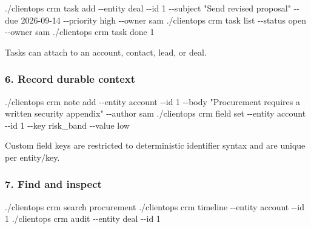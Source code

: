\documentclass[
]{article}
\newenvironment{Shaded}{}{}
\newcommand{\AttributeTok}[1]{\textcolor[rgb]{0.49,0.56,0.16}{#1}}
\newcommand{\ExtensionTok}[1]{#1}
\newcommand{\NormalTok}[1]{#1}
\newcommand{\StringTok}[1]{\textcolor[rgb]{0.25,0.44,0.63}{#1}}
\begin{document}
\begin{Shaded}
\begin{Highlighting}[]
\ExtensionTok{./clientops}\NormalTok{ crm task add }\AttributeTok{{-}{-}entity}\NormalTok{ deal }\AttributeTok{{-}{-}id}\NormalTok{ 1 }\AttributeTok{{-}{-}subject} \StringTok{"Send revised proposal"} \AttributeTok{{-}{-}due}\NormalTok{ 2026{-}09{-}14 }\AttributeTok{{-}{-}priority}\NormalTok{ high }\AttributeTok{{-}{-}owner}\NormalTok{ sam}
\ExtensionTok{./clientops}\NormalTok{ crm task list }\AttributeTok{{-}{-}status}\NormalTok{ open }\AttributeTok{{-}{-}owner}\NormalTok{ sam}
\ExtensionTok{./clientops}\NormalTok{ crm task done 1}
\end{Highlighting}
\end{Shaded}

Tasks can attach to an account, contact, lead, or deal.

\subsubsection{6. Record durable
context}\label{6-record-durable-context}

\begin{Shaded}
\begin{Highlighting}[]
\ExtensionTok{./clientops}\NormalTok{ crm note add }\AttributeTok{{-}{-}entity}\NormalTok{ account }\AttributeTok{{-}{-}id}\NormalTok{ 1 }\AttributeTok{{-}{-}body} \StringTok{"Procurement requires a written security appendix"} \AttributeTok{{-}{-}author}\NormalTok{ sam}
\ExtensionTok{./clientops}\NormalTok{ crm field set }\AttributeTok{{-}{-}entity}\NormalTok{ account }\AttributeTok{{-}{-}id}\NormalTok{ 1 }\AttributeTok{{-}{-}key}\NormalTok{ risk\_band }\AttributeTok{{-}{-}value}\NormalTok{ low}
\end{Highlighting}
\end{Shaded}

Custom field keys are restricted to deterministic identifier syntax and
are unique per entity/key.

\subsubsection{7. Find and inspect}\label{7-find-and-inspect}

\begin{Shaded}
\begin{Highlighting}[]
\ExtensionTok{./clientops}\NormalTok{ crm search procurement}
\ExtensionTok{./clientops}\NormalTok{ crm timeline }\AttributeTok{{-}{-}entity}\NormalTok{ account }\AttributeTok{{-}{-}id}\NormalTok{ 1}
\ExtensionTok{./clientops}\NormalTok{ crm audit }\AttributeTok{{-}{-}entity}\NormalTok{ deal }\AttributeTok{{-}{-}id}\NormalTok{ 1}
\end{Highlighting}
\end{Shaded}
\end{document}

